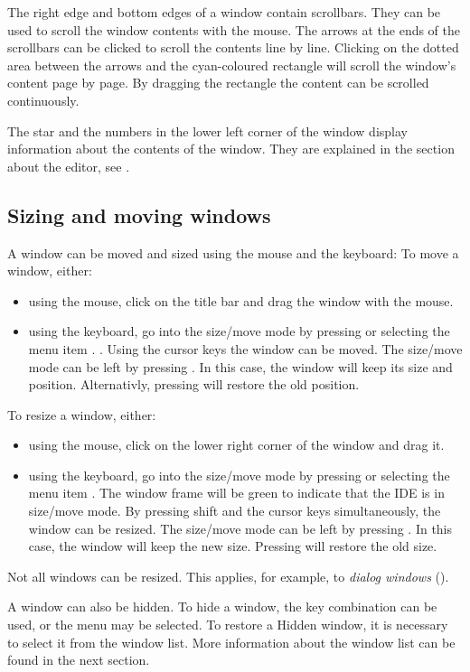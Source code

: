 The right edge and bottom edges of a window contain scrollbars.
They can be used to scroll the window contents with the mouse. 
The arrows at the ends of the scrollbars can be clicked to scroll the 
contents line by line. Clicking on the dotted area between the arrows 
and the cyan-coloured rectangle will scroll the window's content 
page by page. By dragging the rectangle the content can be scrolled 
continuously.

The star and the numbers in the lower left corner of the window
display information about the contents of the window. They
are explained in the section about the editor, see .

%
%
\subsection{Sizing and moving windows}
\label{se:windowsizingmoving}
A window can be moved and sized using the mouse and the keyboard:
To move a window, either:
\begin{itemize}
\item using the mouse, click on the title bar and drag the window 
with the mouse.
\item using the keyboard, go into the size/move mode
by pressing  or selecting the menu item
. . Using the cursor keys the window can be moved. 
The size/move mode can be left by pressing . 
In this case, the window will keep its size and position. 
Alternativly, pressing  will restore the old position.
\end{itemize} 
To resize a window, either:
\begin{itemize}
\item using the mouse, click on the lower right corner of the window
and drag it.
\item using the keyboard, go into the size/move mode
by pressing  or selecting the menu item
. The window frame will be green to indicate that
the IDE is in size/move mode. 
By pressing shift and the cursor keys simultaneously, the window can 
be resized.  The size/move mode can be left by pressing
. In this case, the window will keep the new size.
Pressing  will restore the old size.
\end{itemize}
Not all windows can be resized. This applies, for example, to
\emph{dialog windows} ().

A window can also be hidden. To hide a window, the  key
combination can be used, or the  menu may be selected.
To restore a Hidden window, it is necessary to select it from the window
list. More information about the window list can be found in the next
section.   
%
%
